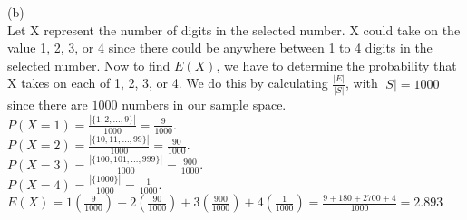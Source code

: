 \begin{solution}
(b) \\
Let X represent the number of digits in the selected number. X could take on the value 1, 2, 3, or 4 since there could be anywhere between 1 to 4 digits in the selected number. Now to find $E(X)$, we have to determine the probability that X takes on each of 1, 2, 3, or 4. We do this by calculating $\frac{|E|}{|S|}$, with $|S| = 1000$ since there are $1000$ numbers in our sample space.\\
\newline
$P(X = 1) = \frac{|\{1, 2, \dots, 9\}|}{1000} = \frac{9}{1000}$.\\
$P(X = 2) = \frac{|\{10, 11, \dots, 99\}|}{1000} = \frac{90}{1000}$.\\
$P(X = 3) = \frac{|\{100, 101, \dots, 999\}|}{1000} = \frac{900}{1000}$.\\
$P(X = 4) = \frac{|\{1000\}|}{1000} = \frac{1}{1000}$.\\
\newline
    $E(X) = 1 (\frac{9}{1000}) + 2 (\frac{90}{1000}) + 3 (\frac{900}{1000}) + 4 (\frac{1}{1000}) = \frac{9 + 180 + 2700 + 4}{1000} = 2.893$

\end{solution}

